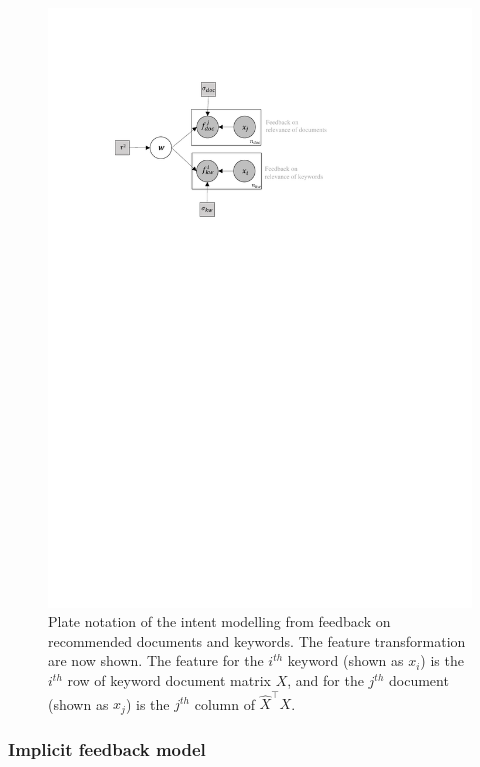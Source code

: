 \documentclass[dissertation,math,vertlayout,pdfa,colorlinks]{aaltoseries}
\newcommand{\tp}{^{\top}}
\begin{document}
\begin{figure}
	\centering
	\includegraphics[width=0.80\linewidth]{Figures/Plate_diagram_intent_kd.pdf}
	\caption{Plate notation of the intent modelling from feedback on recommended documents and keywords. The feature transformation are now shown. The feature for the $i^{th}$ keyword (shown as $x_i$) is the $i^{th}$ row of keyword document matrix $X$, and for the $j^{th}$ document (shown as $x_j$) is the $j^{th}$ column of $\hat{X}\tp X$.}
	\label{fig:Plate_intent_kd}
\end{figure}


\subsubsection{Implicit feedback model}
\end{document}
